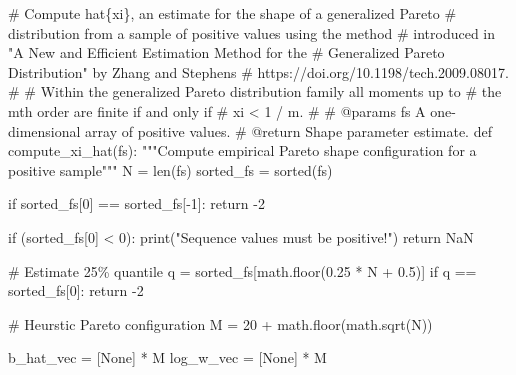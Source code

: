 \documentclass[
  letterpaper,
  DIV=11,
  numbers=noendperiod]{scrartcl}
\newenvironment{Shaded}{\begin{snugshade}}{\end{snugshade}}
\newcommand{\BuiltInTok}[1]{\textcolor[rgb]{0.00,0.23,0.31}{#1}}
\newcommand{\CommentTok}[1]{\textcolor[rgb]{0.37,0.37,0.37}{#1}}
\newcommand{\ControlFlowTok}[1]{\textcolor[rgb]{0.00,0.23,0.31}{#1}}
\newcommand{\DecValTok}[1]{\textcolor[rgb]{0.68,0.00,0.00}{#1}}
\newcommand{\FloatTok}[1]{\textcolor[rgb]{0.68,0.00,0.00}{#1}}
\newcommand{\KeywordTok}[1]{\textcolor[rgb]{0.00,0.23,0.31}{#1}}
\newcommand{\NormalTok}[1]{\textcolor[rgb]{0.00,0.23,0.31}{#1}}
\newcommand{\OperatorTok}[1]{\textcolor[rgb]{0.37,0.37,0.37}{#1}}
\newcommand{\StringTok}[1]{\textcolor[rgb]{0.13,0.47,0.30}{#1}}
\newcommand{\VariableTok}[1]{\textcolor[rgb]{0.07,0.07,0.07}{#1}}
\begin{document}
\begin{Shaded}
\begin{Highlighting}[]

\CommentTok{\# Compute hat\{xi\}, an estimate for the shape of a generalized Pareto }
\CommentTok{\# distribution from a sample of positive values using the method }
\CommentTok{\# introduced in "A New and Efficient Estimation Method for the }
\CommentTok{\# Generalized Pareto Distribution" by Zhang and Stephens }
\CommentTok{\# https://doi.org/10.1198/tech.2009.08017.}
\CommentTok{\# }
\CommentTok{\# Within the generalized Pareto distribution family all moments up to }
\CommentTok{\# the mth order are finite if and only if }
\CommentTok{\#  xi \textless{} 1 / m.}
\CommentTok{\#}
\CommentTok{\# @params fs A one{-}dimensional array of positive values.}
\CommentTok{\# @return Shape parameter estimate.}
\KeywordTok{def}\NormalTok{ compute\_xi\_hat(fs):}
  \CommentTok{"""Compute empirical Pareto shape configuration for a positive sample"""}
\NormalTok{  N }\OperatorTok{=} \BuiltInTok{len}\NormalTok{(fs)}
\NormalTok{  sorted\_fs }\OperatorTok{=} \BuiltInTok{sorted}\NormalTok{(fs)}
  
  \ControlFlowTok{if}\NormalTok{ sorted\_fs[}\DecValTok{0}\NormalTok{] }\OperatorTok{==}\NormalTok{ sorted\_fs[}\OperatorTok{{-}}\DecValTok{1}\NormalTok{]:}
    \ControlFlowTok{return} \OperatorTok{{-}}\DecValTok{2}
  
  \ControlFlowTok{if}\NormalTok{ (sorted\_fs[}\DecValTok{0}\NormalTok{] }\OperatorTok{\textless{}} \DecValTok{0}\NormalTok{):}
    \BuiltInTok{print}\NormalTok{(}\StringTok{"Sequence values must be positive!"}\NormalTok{)}
    \ControlFlowTok{return}\NormalTok{ NaN}
  
  \CommentTok{\# Estimate 25\% quantile}
\NormalTok{  q }\OperatorTok{=}\NormalTok{ sorted\_fs[math.floor(}\FloatTok{0.25} \OperatorTok{*}\NormalTok{ N }\OperatorTok{+} \FloatTok{0.5}\NormalTok{)]}
  \ControlFlowTok{if}\NormalTok{ q }\OperatorTok{==}\NormalTok{ sorted\_fs[}\DecValTok{0}\NormalTok{]:}
    \ControlFlowTok{return} \OperatorTok{{-}}\DecValTok{2}
    
  \CommentTok{\# Heurstic Pareto configuration}
\NormalTok{  M }\OperatorTok{=} \DecValTok{20} \OperatorTok{+}\NormalTok{ math.floor(math.sqrt(N))}
  
\NormalTok{  b\_hat\_vec }\OperatorTok{=}\NormalTok{ [}\VariableTok{None}\NormalTok{] }\OperatorTok{*}\NormalTok{ M}
\NormalTok{  log\_w\_vec }\OperatorTok{=}\NormalTok{ [}\VariableTok{None}\NormalTok{] }\OperatorTok{*}\NormalTok{ M}
  

\end{Highlighting}
\end{Shaded}
\end{document}
